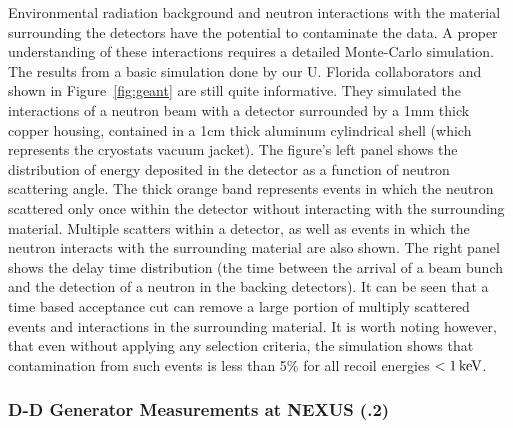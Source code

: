 Environmental radiation background and neutron interactions with the material surrounding the detectors have the potential to contaminate the data. A proper understanding of these interactions requires a detailed Monte-Carlo simulation. The results from a basic \geant simulation done by our U. Florida collaborators and shown in Figure~\ref{fig:geant} are still quite informative. They simulated the interactions of a neutron beam with a detector surrounded by a 1mm thick copper housing, contained in a 1cm thick aluminum cylindrical shell (which represents the cryostats vacuum jacket). The figure's left panel shows the distribution of energy deposited in the detector as a function of neutron scattering angle. The thick orange band represents events in which the neutron scattered only once within the detector without interacting with the surrounding material.  Multiple scatters within a detector, as well as events in which the neutron interacts with the surrounding material are also shown. The right panel shows the delay time distribution (the time between the arrival of a beam bunch and the detection of a neutron in the backing detectors). It can be seen that a time based acceptance cut can remove a large portion of multiply scattered events and interactions in the surrounding material. It is worth noting however, that even without applying any selection criteria, the simulation shows that contamination from such events is less than 5\% for all recoil energies \(< 1\,\mathrm{keV}\).



\subsubsection{D-D Generator Measurements at NEXUS (.2)}
\label{sec:ddcal}


